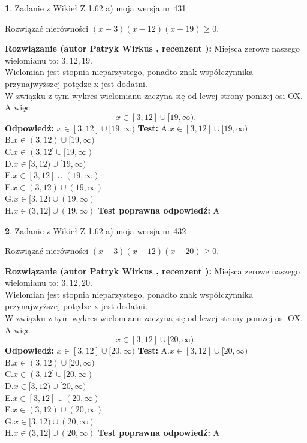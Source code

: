 \documentclass[12pt, a4paper]{article}
\theoremstyle{definition} %
\newtheorem{zad}{}
\newcommand{\zadStart}[1]{\begin{zad}#1\newline}
\newcommand{\zadStop}{\end{zad}}
\newcommand{\rozwStart}[2]{\noindent \textbf{Rozwiązanie (autor #1 , recenzent #2): }\newline}
\newcommand{\rozwStop}{\newline}
\newcommand{\odpStart}{\noindent \textbf{Odpowiedź:}\newline}
\newcommand{\odpStop}{\newline}
\newcommand{\testStart}{\noindent \textbf{Test:}\newline}
\newcommand{\testStop}{\newline}
\newcommand{\kluczStart}{\noindent \textbf{Test poprawna odpowiedź:}\newline}
\newcommand{\kluczStop}{\newline}
\begin{document}
\zadStart{Zadanie z Wikieł Z 1.62 a) moja wersja nr 431}

Rozwiązać nierówności $(x-3)(x-12)(x-19)\ge0$.
\zadStop
\rozwStart{Patryk Wirkus}{}
Miejsca zerowe naszego wielomianu to: $3, 12, 19$.\\
Wielomian jest stopnia nieparzystego, ponadto znak współczynnika przy\linebreak najwyższej potędze x jest dodatni.\\ W związku z tym wykres wielomianu zaczyna się od lewej strony poniżej osi OX. A więc $$x \in [3,12] \cup [19,\infty).$$
\rozwStop
\odpStart
$x \in [3,12] \cup [19,\infty)$
\odpStop
\testStart
A.$x \in [3,12] \cup [19,\infty)$\\
B.$x \in (3,12) \cup [19,\infty)$\\
C.$x \in (3,12] \cup [19,\infty)$\\
D.$x \in [3,12) \cup [19,\infty)$\\
E.$x \in [3,12] \cup (19,\infty)$\\
F.$x \in (3,12) \cup (19,\infty)$\\
G.$x \in [3,12) \cup (19,\infty)$\\
H.$x \in (3,12] \cup (19,\infty)$
\testStop
\kluczStart
A
\kluczStop



\zadStart{Zadanie z Wikieł Z 1.62 a) moja wersja nr 432}

Rozwiązać nierówności $(x-3)(x-12)(x-20)\ge0$.
\zadStop
\rozwStart{Patryk Wirkus}{}
Miejsca zerowe naszego wielomianu to: $3, 12, 20$.\\
Wielomian jest stopnia nieparzystego, ponadto znak współczynnika przy\linebreak najwyższej potędze x jest dodatni.\\ W związku z tym wykres wielomianu zaczyna się od lewej strony poniżej osi OX. A więc $$x \in [3,12] \cup [20,\infty).$$
\rozwStop
\odpStart
$x \in [3,12] \cup [20,\infty)$
\odpStop
\testStart
A.$x \in [3,12] \cup [20,\infty)$\\
B.$x \in (3,12) \cup [20,\infty)$\\
C.$x \in (3,12] \cup [20,\infty)$\\
D.$x \in [3,12) \cup [20,\infty)$\\
E.$x \in [3,12] \cup (20,\infty)$\\
F.$x \in (3,12) \cup (20,\infty)$\\
G.$x \in [3,12) \cup (20,\infty)$\\
H.$x \in (3,12] \cup (20,\infty)$
\testStop
\kluczStart
A
\kluczStop
\end{document}
